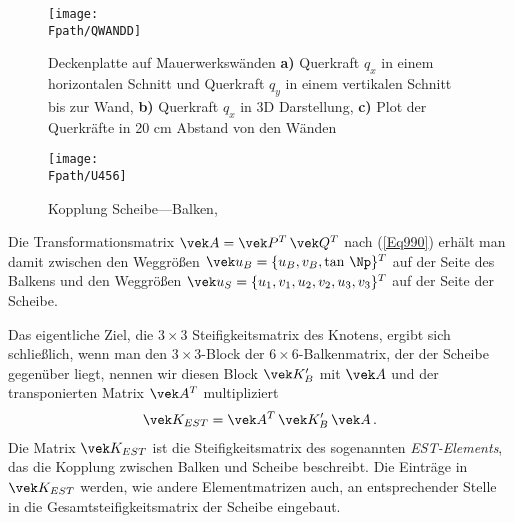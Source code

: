 {{\newif\ifpdf
    \ifx\pdfoutput\undefined
    \pdffalse %
    \else
    \pdftrue
    \fi
\newcommand{\Fpath}{d:/astatikbilder/pdf}

\begin{figure}[tbp]
\centering
\if {} \sidecaption \fi
\texttt{[image: \\Fpath/QWANDD]}
\caption{Deckenplatte auf Mauerwerksw\"{a}nden {\bf a)} Querkraft $q_x$ in einem
horizontalen Schnitt und Querkraft $q_y$ in einem vertikalen Schnitt bis zur Wand,{\bf
b)} Querkraft $q_x$ in 3D Darstellung, {\bf c)} Plot der Querkr\"{a}fte in 20 cm Abstand von den W\"{a}nden} \label{QWand}
\end{figure}%


\begin{figure}[tbp]
\if {} \sidecaption[t] \fi
\centering
\texttt{[image: \\Fpath/U456]}
\caption{Kopplung Scheibe---Balken, \cite{Werkle3} }
\label{U456}
\end{figure}%


Die Transformationsmatrix $\vek A = \vek P^T\,\vek Q^T$ nach (\ref{Eq990}) erh\"{a}lt man damit
zwischen den Weggr\"{o}{\ss}en $\vek u_B = \{u_B, v_B, \tan\,\Np\}^T$ auf der Seite des Balkens und den Weggr\"{o}{\ss}en $\vek u_S = \{u_1, v_1, u_2, v_2, u_3, v_3\}^T$ auf der Seite der Scheibe.

Das eigentliche Ziel, die $3 \times 3$ Steifigkeitsmatrix des Knotens, ergibt sich schlie{\ss}lich, wenn man den $3 \times 3$-Block der $6 \times 6$-Balkenmatrix, der der Scheibe gegen\"{u}ber liegt, nennen wir diesen Block $\vek K_B'$ mit $\vek A$ und der transponierten Matrix $\vek A^T$ multipliziert
\begin{align}\label{Eq1700}
\vek K_{EST} = \vek A^T\,\vek K_B'\,\vek A \,.
\end{align}
Die Matrix $\vek K_{EST}$ ist die Steifigkeitsmatrix des sogenannten {\em EST-Elements\/}, das die Kopplung zwischen Balken und Scheibe beschreibt. Die Eintr\"{a}ge in $\vek K_{EST}$ werden, wie andere Elementmatrizen auch, an entsprechender Stelle in die Gesamtsteifigkeitsmatrix der Scheibe eingebaut.

}}
